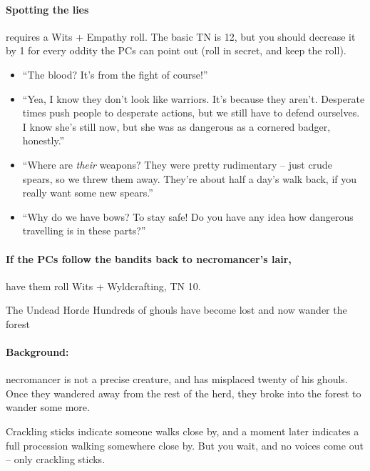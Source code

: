 \begin{multicols}{2}
\paragraph{Spotting the lies}
requires a Wits + Empathy roll.
The basic TN is 12, but you should decrease it by 1 for every oddity the PCs can point out (roll in secret, and keep the roll).

\begin{itemize}
  \item
  ``The blood? It's from the fight of course!''
  \item
  ``Yea, I know they don't look like warriors.
  It's because they aren't.
  Desperate times push people to desperate actions, but we still have to defend ourselves.
  I know she's still now, but she was as dangerous as a cornered badger, honestly.''
  \item
  ``Where are \emph{their} weapons?
  They were pretty rudimentary -- just crude spears, so we threw them away.
  They're about half a day's walk back, if you really want some new spears.''
  \item
  ``Why do we have bows?
  To stay safe!
  Do you have any idea how dangerous travelling is in these parts?''
\end{itemize}

\banditking


\paragraph{If the PCs follow the bandits back to \gls{necromancer}'s lair,}
have them roll Wits + Wyldcrafting, TN 10.

{The Undead Horde}%
{Hundreds of ghouls have become lost and now wander the forest}%

\paragraph{Background:}
\Gls{necromancer} is not a precise creature, and has misplaced twenty of his ghouls.
Once they wandered away from the rest of the herd, they broke into the forest to wander some more.

\begin{boxtext}

  Crackling sticks indicate someone walks close by, and a moment later indicates a full procession walking somewhere close by.
  But you wait, and no voices come out -- only crackling sticks.


\end{boxtext}
\end{multicols}
